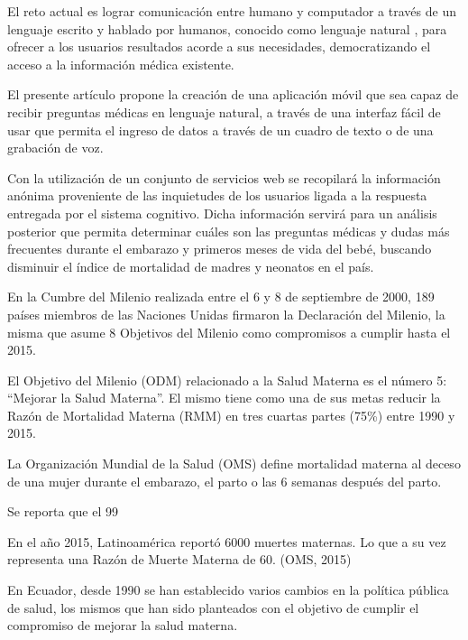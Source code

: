 \documentclass[12pt]{article}
\begin{document}
El reto actual es lograr comunicación entre humano y computador a través de un lenguaje escrito y hablado por humanos, conocido como lenguaje natural \cite{ibm2015}, para ofrecer a los usuarios resultados acorde a sus necesidades, democratizando el acceso a la información médica existente.

El presente artículo propone la creación de una aplicación móvil que sea capaz de recibir preguntas médicas en lenguaje natural, a través de una interfaz fácil de usar que permita el ingreso de datos a través de un cuadro de texto o de una grabación de voz.%

Con la utilización de un conjunto de servicios web se recopilará la información anónima proveniente de las inquietudes de los usuarios ligada a la respuesta entregada por el sistema cognitivo. Dicha información servirá para un análisis posterior que permita determinar cuáles son las preguntas médicas y dudas más frecuentes durante el embarazo y primeros meses de vida del bebé, buscando disminuir el índice de mortalidad de madres y neonatos en el país.

En la Cumbre del Milenio realizada entre el 6 y 8 de septiembre de 2000, 189 países miembros de las Naciones Unidas firmaron la Declaración del Milenio, la misma que asume 8 Objetivos del Milenio como compromisos a cumplir hasta el 2015.

El Objetivo del Milenio (ODM) relacionado a la Salud Materna es el número 5: “Mejorar la Salud Materna”. El mismo tiene como una de sus metas reducir la Razón de Mortalidad Materna (RMM) en tres cuartas partes (75\%) entre 1990 y 2015.

La Organización Mundial de la Salud (OMS) define mortalidad materna al deceso de una mujer durante el embarazo, el parto o las 6 semanas después del parto.

Se reporta que el 99%

En el año 2015, Latinoamérica reportó 6000 muertes maternas. Lo que a su vez representa una Razón de Muerte Materna de 60. (OMS, 2015)

En Ecuador, desde 1990 se han establecido varios cambios en la política pública de salud, los mismos que han sido planteados con el objetivo de cumplir el compromiso de mejorar la salud materna.
\end{document}
